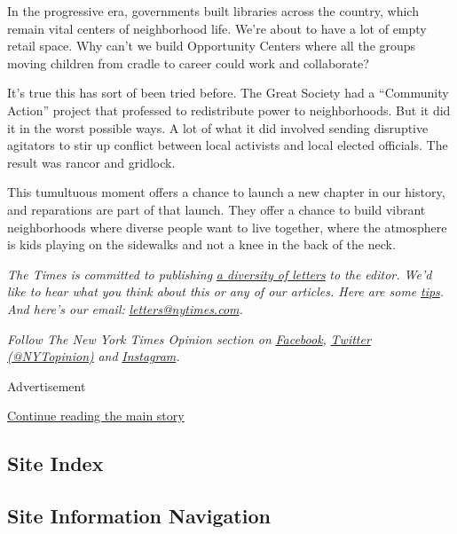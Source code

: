 In the progressive era, governments built libraries across the country,
which remain vital centers of neighborhood life. We're about to have a
lot of empty retail space. Why can't we build Opportunity Centers where
all the groups moving children from cradle to career could work and
collaborate?

It's true this has sort of been tried before. The Great Society had a
``Community Action'' project that professed to redistribute power to
neighborhoods. But it did it in the worst possible ways. A lot of what
it did involved sending disruptive agitators to stir up conflict between
local activists and local elected officials. The result was rancor and
gridlock.

This tumultuous moment offers a chance to launch a new chapter in our
history, and reparations are part of that launch. They offer a chance to
build vibrant neighborhoods where diverse people want to live together,
where the atmosphere is kids playing on the sidewalks and not a knee in
the back of the neck.

\emph{The Times is committed to publishing}
\href{https://www.nytimes.com/2019/01/31/opinion/letters/letters-to-editor-new-york-times-women.html}{\emph{a
diversity of letters}} \emph{to the editor. We'd like to hear what you
think about this or any of our articles. Here are some}
\href{https://help.nytimes.com/hc/en-us/articles/115014925288-How-to-submit-a-letter-to-the-editor}{\emph{tips}}\emph{.
And here's our email:}
\href{mailto:letters@nytimes.com}{\emph{letters@nytimes.com}}\emph{.}

\emph{Follow The New York Times Opinion section on}
\href{https://www.facebook.com/nytopinion}{\emph{Facebook}}\emph{,}
\href{http://twitter.com/NYTOpinion}{\emph{Twitter (@NYTopinion)}}
\emph{and}
\href{https://www.instagram.com/nytopinion/}{\emph{Instagram}}\emph{.}

Advertisement

\protect\hyperlink{after-bottom}{Continue reading the main story}

\hypertarget{site-index}{%
\subsection{Site Index}\label{site-index}}

\hypertarget{site-information-navigation}{%
\subsection{Site Information
Navigation}\label{site-information-navigation}}

